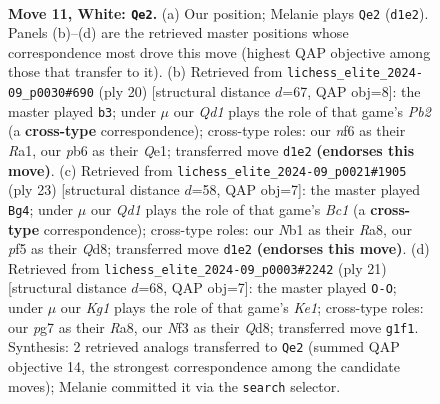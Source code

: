 \documentclass[11pt]{article}
\begin{document}
\clearpage

\begin{figure}[p]\centering
\begin{subfigure}{0.46\textwidth}\centering
\resizebox{\linewidth}{!}{%
\newchessgame
\chessboard[
  setfen={rnbq1rk1/p3b1pp/1pp2n2/3p1p2/3P4/1P2PNP1/P4PBP/RNBQR1K1 w - - 0 11},
  showmover=false,
  pgfstyle=straightmove, color=movearrow, markmove={d1-e2}
]}
\caption{}
\end{subfigure}\hfill
\begin{subfigure}{0.46\textwidth}\centering
\resizebox{\linewidth}{!}{%
\newchessgame
\chessboard[
  setfen={1rbq1rk1/pp2ppbp/3p1np1/2p5/4PP2/2NP1N2/PPP3PP/R1B1QRK1 w - - 3 11},
  showmover=false,
  pgfstyle=straightmove, color=movearrow, markmove={b2-b3}
]}
\caption{}
\end{subfigure}
\\[4pt]
\begin{subfigure}{0.46\textwidth}\centering
\resizebox{\linewidth}{!}{%
\newchessgame
\chessboard[
  setfen={r1bq1rk1/1p3pbp/2n2np1/p2p4/2pP3P/5NP1/PPP2PB1/R1BQRNK1 b - - 1 12},
  showmover=false,
  pgfstyle=straightmove, color=movearrow, markmove={c8-g4}
]}
\caption{}
\end{subfigure}\hfill
\begin{subfigure}{0.46\textwidth}\centering
\resizebox{\linewidth}{!}{%
\newchessgame
\chessboard[
  setfen={rn1qk2r/4ppbp/2pp1np1/1p6/p2PP3/2P2N1P/PPB2PP1/R1BQ1RK1 b kq - 0 11},
  showmover=false,
  pgfstyle=straightmove, color=movearrow, markmove={e8-g8}
]}
\caption{}
\end{subfigure}
\caption{\textbf{Move 11, White: \texttt{Qe2}.} (a) Our position; Melanie plays \texttt{Qe2} (\texttt{d1e2}). Panels (b)--(d) are the retrieved master positions whose correspondence most drove this move (highest QAP objective among those that transfer to it). (b) Retrieved from \texttt{lichess\_elite\_2024-09\_p0030\#690} (ply 20) [structural distance $d$=67, QAP obj=8]: the master played \texttt{b3}; under $\mu$ our \emph{Qd1} plays the role of that game's \emph{Pb2} (a \textbf{cross-type} correspondence); cross-type roles: our \emph{n}f6 as their \emph{R}a1, our \emph{p}b6 as their \emph{Q}e1; transferred move \texttt{d1e2} \textbf{(endorses this move)}. (c) Retrieved from \texttt{lichess\_elite\_2024-09\_p0021\#1905} (ply 23) [structural distance $d$=58, QAP obj=7]: the master played \texttt{Bg4}; under $\mu$ our \emph{Qd1} plays the role of that game's \emph{Bc1} (a \textbf{cross-type} correspondence); cross-type roles: our \emph{N}b1 as their \emph{R}a8, our \emph{p}f5 as their \emph{Q}d8; transferred move \texttt{d1e2} \textbf{(endorses this move)}. (d) Retrieved from \texttt{lichess\_elite\_2024-09\_p0003\#2242} (ply 21) [structural distance $d$=68, QAP obj=7]: the master played \texttt{O-O}; under $\mu$ our \emph{Kg1} plays the role of that game's \emph{Ke1}; cross-type roles: our \emph{p}g7 as their \emph{R}a8, our \emph{N}f3 as their \emph{Q}d8; transferred move \texttt{g1f1}. Synthesis: 2 retrieved analogs transferred to \texttt{Qe2} (summed QAP objective 14, the strongest correspondence among the candidate moves); Melanie committed it via the \texttt{search} selector.}
\label{fig:thought-m20}
\end{figure}
\end{document}
